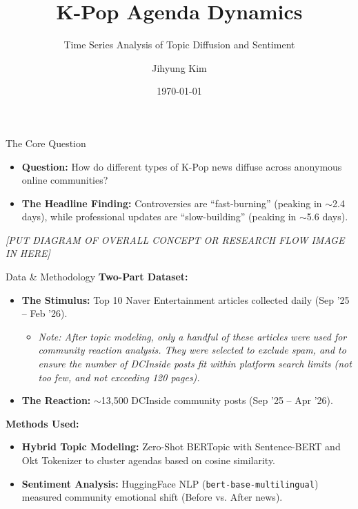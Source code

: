 \documentclass[aspectratio=169]{beamer}
\title{K-Pop Agenda Dynamics}
\subtitle{Time Series Analysis of Topic Diffusion and Sentiment}
\author{Jihyung Kim}
\institute{QSS 45 Final Project}
\date{\today}
\begin{document}
\begin{frame}
    \titlepage
\end{frame}

\begin{frame}{The Core Question}
    \begin{itemize}
        \item \textbf{Question:} How do different types of K-Pop news diffuse across anonymous online communities?
        \item \textbf{The Headline Finding:} Controversies are ``fast-burning'' (peaking in $\sim$2.4 days), while professional updates are ``slow-building'' (peaking in $\sim$5.6 days).
    \end{itemize}
    
    \vspace{1cm}
    \begin{center}
        \textit{[PUT DIAGRAM OF OVERALL CONCEPT OR RESEARCH FLOW IMAGE IN HERE]}
    \end{center}
\end{frame}

\begin{frame}{Data \& Methodology}
    \textbf{Two-Part Dataset:}
    \begin{itemize}
        \item \textbf{The Stimulus:} Top 10 Naver Entertainment articles collected daily (Sep '25 -- Feb '26).
        \begin{itemize}
            \item \textit{Note: After topic modeling, only a handful of these articles were used for community reaction analysis. They were selected to exclude spam, and to ensure the number of DCInside posts fit within platform search limits (not too few, and not exceeding 120 pages).}
        \end{itemize}
        \item \textbf{The Reaction:} $\sim$13,500 DCInside community posts (Sep '25 -- Apr '26).
    \end{itemize}
    
    \vspace{0.5cm}
    \textbf{Methods Used:}
    \begin{itemize}
        \item \textbf{Hybrid Topic Modeling:} Zero-Shot BERTopic with Sentence-BERT and Okt Tokenizer to cluster agendas based on cosine similarity.
        \item \textbf{Sentiment Analysis:} HuggingFace NLP (\texttt{bert-base-multilingual}) measured community emotional shift (Before vs. After news).
    \end{itemize}
\end{frame}
\end{document}

